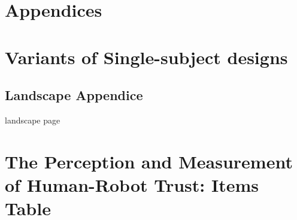 \section*{Appendices}
\section{Variants of Single-subject designs}

\newpage
\begin{landscape}
	\section{Landscape Appendice}
	\label{app:Educational}	
	landscape page
\end{landscape}

\newpage
\section{The Perception and Measurement of Human-Robot Trust: Items Table}

